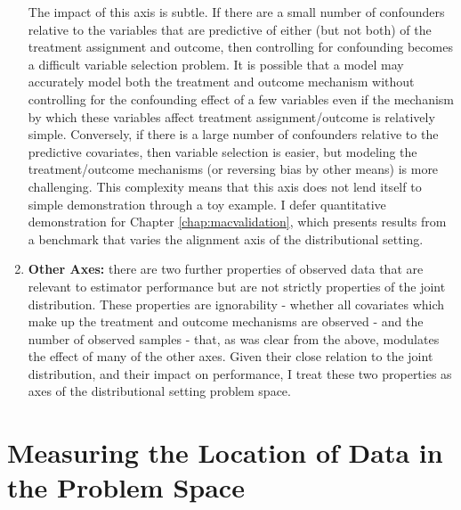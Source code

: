 \documentclass[../main.tex]{subfiles}
\begin{document}
\begin{enumerate}
\vspace{\baselineskip}

The impact of this axis is subtle. If there are a small number of confounders relative to the variables that are predictive of either (but not both) of the treatment assignment and outcome, then controlling for confounding becomes a difficult variable selection problem. It is possible that a model may accurately model both the treatment and outcome mechanism without controlling for the confounding effect of a few variables even if the mechanism by which these variables affect treatment assignment/outcome is relatively simple. Conversely, if there is a large number of confounders relative to the predictive covariates, then variable selection is easier, but modeling the treatment/outcome mechanisms (or reversing bias by other means) is more challenging. This complexity means that this axis does not lend itself to simple demonstration through a toy example. I defer quantitative demonstration for Chapter \ref{chap:macvalidation}, which presents results from a benchmark that varies the alignment axis of the distributional setting.


\vspace{\baselineskip}
    \item \textbf{Other Axes:} there are two further properties of observed data that are relevant to estimator performance but are not strictly properties of the joint distribution. These properties are ignorability - whether all covariates which make up the treatment and outcome mechanisms are observed - and the number of observed samples - that, as was clear from the above, modulates the effect of many of the other axes. Given their close relation to the joint distribution, and their impact on performance, I treat these two properties as axes of the distributional setting problem space.\par

\end{enumerate}

\section{Measuring the Location of Data in the Problem Space}
\end{document}
